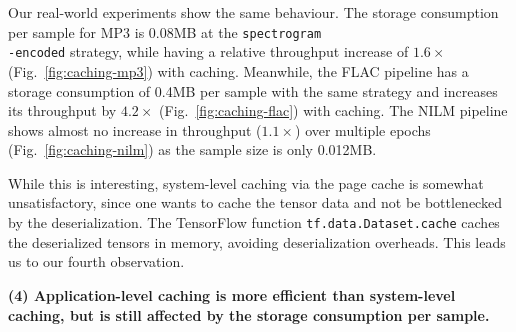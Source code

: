 {\color{diff}

Our real-world experiments show the same behaviour.
The storage consumption per sample for MP3 is 0.08\:MB at the \texttt{spectrogram\\-encoded} strategy, while having a relative throughput increase of $1.6\times$ (Fig.~\ref{fig:caching-mp3}) with caching.
Meanwhile, the FLAC pipeline has a storage consumption of 0.4\:MB per sample with the same strategy and increases its throughput by $4.2\times$ (Fig.~\ref{fig:caching-flac}) with caching.
The NILM pipeline shows almost no increase in throughput ($1.1\times$) over multiple epochs (Fig.~\ref{fig:caching-nilm}) as the sample size is only 0.012\:MB.

While this is interesting, system-level caching via the page cache is somewhat unsatisfactory, since one wants to cache the tensor data and not be bottlenecked by the deserialization.
The TensorFlow function \texttt{tf.data.Dataset.cache} caches the deserialized tensors in memory, avoiding deserialization overheads.
This leads us to our fourth observation.

\begin{table}[h]
\caption{{\color{diff}Throughput increase for different caching level compared to no caching of of each pipeline's last strategy.}}
\label{tab:throughput-caching-levels}
\end{table}
\vspace{-0.7cm}

\textbf{(4) Application-level caching is more efficient than system-level caching, but is still affected by the storage consumption per sample. }

}

